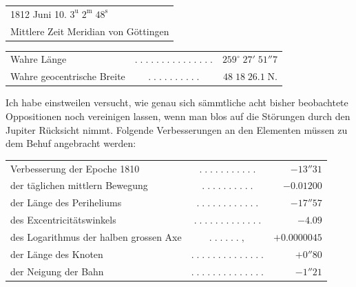 \begin{center}\fontsize{10}{12}\selectfont\setlength{\tabcolsep}{0pt}\renewcommand{\arraystretch}{1.15}\begin{tabular}{l}
1812 Juni 10. $3^{\mathrm u}\;2^{\mathrm m}\;48^{\mathrm s}$\\Mittlere Zeit Meridian von Göttingen
\end{tabular}\end{center}
\begin{center}\fontsize{10}{12}\selectfont\setlength{\tabcolsep}{2pt}\renewcommand{\arraystretch}{1.15}\begin{tabular}{lcr}
Wahre Länge & $.\;.\;.\;.\;.\;.\;.\;.\;.\;.\;.\;.\;.\;.\;.$ & $259^\circ\;27'\;51''7$\\
Wahre geocentrische Breite & $.\;.\;.\;.\;.\;.\;.\;.\;.\;.$ & $48\;18\;26.1\;\mathrm{N}.$\\
\end{tabular}\end{center}

\par\indent Ich habe einstweilen versucht, wie genau sich sämmtliche acht bisher beobachtete Oppositionen
noch vereinigen lassen, wenn man blos auf die Störungen durch den Jupiter Rücksicht nimmt. Folgende
Verbesserungen an den Elementen müssen zu dem Behuf angebracht werden:

\begin{center}\fontsize{9}{11}\selectfont\setlength{\tabcolsep}{2pt}\renewcommand{\arraystretch}{1.15}\begin{tabular}{lcr}
Verbesserung der Epoche 1810 & $.\;.\;.\;.\;.\;.\;.\;.\;.\;.\;.$ & $-13''31$\\
der täglichen mittlern Bewegung & $.\;.\;.\;.\;.\;.\;.\;.\;.\;.$ & $-0.01200$\\
der Länge des Periheliums & $.\;.\;.\;.\;.\;.\;.\;.\;.\;.\;.\;.$ & $-17''57$\\
des Excentricitätswinkels & $.\;.\;.\;.\;.\;.\;.\;.\;.\;.\;.\;.\;.$ & $-4.09$\\
des Logarithmus der halben grossen Axe & $.\;.\;.\;.\;.\;.\;,$ & $+0.0000045$\\
der Länge des Knoten & $.\;.\;.\;.\;.\;.\;.\;.\;.\;.\;.\;.\;.\;.$ & $+0''80$\\
der Neigung der Bahn & $.\;.\;.\;.\;.\;.\;.\;.\;.\;.\;.\;.\;.\;.$ & $-1''21$\\
\end{tabular}\end{center}

